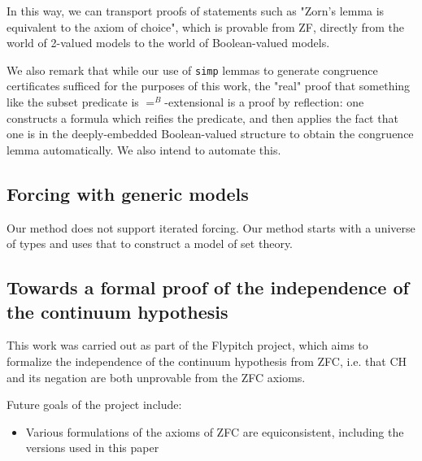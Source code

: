 \documentclass[a4paper,USenglish,cleveref, autoref]{lipics-v2019}
\begin{document}
In this way, we can transport proofs of statements such as "Zorn's lemma is equivalent to the axiom of choice", which is provable from ZF, directly from the world of 2-valued models to the world of Boolean-valued models.

We also remark that while our use of \texttt{simp} lemmas to generate congruence certificates sufficed for the purposes of this work, the "real" proof that something like the subset predicate is $=^B$-extensional is a proof by reflection: one constructs a formula which reifies the predicate, and then applies the fact that one is in the deeply-embedded Boolean-valued structure to obtain the congruence lemma automatically. We also intend to automate this.
\subsection{Forcing with generic models}

Our method does not support iterated forcing. Our method starts with a universe of types and uses that to construct a model of set theory.
\subsection{Towards a formal proof of the independence of the continuum hypothesis}


This work was carried out as part of the Flypitch project, which aims to formalize the independence of the continuum hypothesis from ZFC, i.e. that CH and its negation are both unprovable from the ZFC axioms.

Future goals of the project include:

\begin{itemize}
\item Various formulations of the axioms of ZFC are equiconsistent, including the versions used in this paper
\end{itemize}
\end{document}
